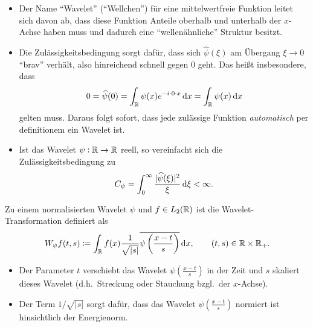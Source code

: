 \begin{remark} \leavevmode
\begin{itemize}
\item Der Name \enquote{Wavelet} (\enquote{Wellchen}) für eine mittelwertfreie Funktion leitet sich
  davon ab, dass diese Funktion Anteile oberhalb und unterhalb der $ x $-Achse haben muss und 
  dadurch eine \enquote{wellenähnliche} Struktur besitzt.
\item Die Zulässigkeitsbedingung sorgt dafür, dass sich $ \widehat{\psi}(\xi) $ am Übergang
  $ \xi \to 0 $ \enquote{brav} verhält, also hinreichend schnell gegen $ 0 $ geht. Das heißt
  insbesondere, dass
  \[
    0 = \widehat{\psi}(0) = \int_{\R} \psi(x) e^{-i \cdot 0 \cdot x} \dif x = \int_{\R} \psi(x) 
    \dif x
  \]
  gelten muss. Daraus folgt sofort, dass jede zulässige Funktion \emph{automatisch} per definitionem
  ein Wavelet ist.
\item Ist das Wavelet $ \psi : \mathbb{R} \rightarrow \mathbb{R} $ reell, so vereinfacht sich die 
  Zulässigkeitsbedingung zu
  \[
    C_{\psi} = \int_{0}^{\infty} \frac{|\widehat{\psi}(\xi)|^{2}}{\xi} \dif \xi < \infty.
  \]
\end{itemize}
\end{remark}

\begin{definition}
Zu einem normalisierten Wavelet $ \psi $ und $ f \in L_{2}(\mathbb{R}) $ ist die Wavelet-Transformation
definiert als
\[
  W_{\psi}f(t, s) \coloneqq
  \int_{\R} f(x) \frac{1}{\sqrt{|s|}} \overline{\psi\left(\frac{x - t}{s}\right)} \dif x, \qquad
    (t,s) \in \R \times \R_{+}.
\]
\end{definition}

\begin{remark} \leavevmode
\begin{itemize}
\item Der Parameter $ t $ verschiebt das Wavelet $ \psi\left(\frac{x - t}{s}\right) $ in der Zeit
  und $ s $ skaliert dieses Wavelet (d.h.\ Streckung oder Stauchung bzgl.\ der $ x $-Achse).
\item Der Term $ 1 / \sqrt{|s|} $ sorgt dafür, dass das Wavelet $ \psi\left(\frac{x - t}{s}\right) $
  normiert ist hinsichtlich der Energienorm.
\end{itemize}
\end{remark}

